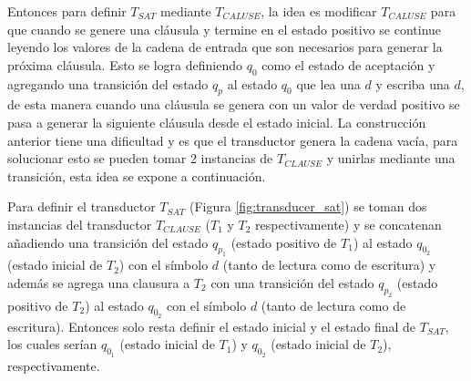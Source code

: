 Entonces para definir $T_{SAT}$ mediante $T_{CALUSE}$, la idea es modificar $T_{CALUSE}$ para que cuando se genere
una cláusula y termine en el estado positivo se continue leyendo los valores de la cadena de entrada que son necesarios para generar
la próxima cláusula. Esto se logra definiendo $q_0$ como el estado de aceptación y agregando una transición del estado 
$q_p$ al estado $q_0$ que lea una $d$ y escriba una $d$, de esta manera cuando una cláusula se genera con un valor de 
verdad positivo se pasa a generar la siguiente cláusula desde el estado inicial. La construcción anterior tiene 
una dificultad y es que el transductor genera la cadena vacía, para solucionar esto se pueden tomar 2 instancias de 
$T_{CLAUSE}$ y unirlas mediante una transición, esta idea se expone a continuación.

Para definir el transductor $T_{SAT}$ (Figura \ref{fig:transducer_sat}) se toman dos instancias del transductor $T_{CLAUSE}$ ($T_1$ y $T_2$ respectivamente) y se concatenan añadiendo una transición del estado $q_{p_1}$ (estado positivo de $T_1$) al estado $q_{0_2}$ (estado inicial de $T_2$) con el símbolo $d$ (tanto de lectura como de escritura) y además se agrega una clausura a $T_2$ con una transición del estado $q_{p_2}$ (estado positivo de $T_2$) al estado $q_{0_2}$ con el símbolo $d$ (tanto de lectura como de escritura). Entonces solo resta definir el estado inicial y el estado final de $T_{SAT}$, los cuales serían $q_{0_1}$ (estado inicial de $T_1$) y $q_{0_2}$ (estado inicial de $T_2$), respectivamente.



